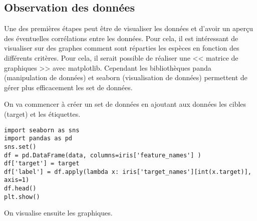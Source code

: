 \subsection{Observation des données}
Une des premières étapes peut être de visualiser les données et d'avoir un aperçu des éventuelles corrélations entre les données. Pour cela, il est intéressant de visualiser sur des graphes comment sont réparties les espèces en fonction des différents critères. 
Pour cela, il serait possible de réaliser une << matrice de graphiques >> avec matplotlib. Cependant les bibliothèques panda (manipulation de données) et seaborn (visualisation de données) permettent de gérer plus efficacement les set de données. 

On va commencer à créer un set de données en ajoutant aux données les cibles (target) et les étiquettes. 
\begin{verbatim}
import seaborn as sns
import pandas as pd
sns.set()
df = pd.DataFrame(data, columns=iris['feature_names'] )
df['target'] = target
df['label'] = df.apply(lambda x: iris['target_names'][int(x.target)], axis=1)
df.head()
plt.show()
\end{verbatim}
On visualise ensuite les graphiques.
